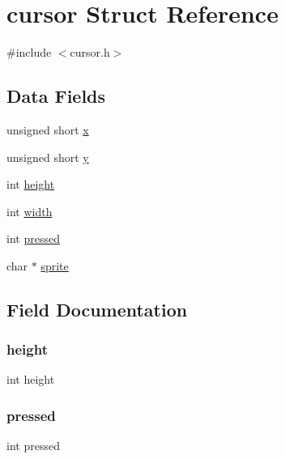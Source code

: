 \hypertarget{structcursor}{}\section{cursor Struct Reference}
\label{structcursor}


{\ttfamily \#include $<$cursor.\+h$>$}

\subsection*{Data Fields}
\begin{DoxyCompactItemize}
\item 
unsigned short \hyperlink{structcursor_a6762fe907d546b988585b308b1c304c2}{x}
\item 
unsigned short \hyperlink{structcursor_a8c9c5ccb800d748c485dfe2b6fa2cd9e}{y}
\item 
int \hyperlink{structcursor_ad12fc34ce789bce6c8a05d8a17138534}{height}
\item 
int \hyperlink{structcursor_a2474a5474cbff19523a51eb1de01cda4}{width}
\item 
int \hyperlink{structcursor_a9a8271834e4fd4341e41a0e182d6cdff}{pressed}
\item 
char $\ast$ \hyperlink{structcursor_a6cffc5f58f86106ef1a6ea2f745efda1}{sprite}
\end{DoxyCompactItemize}


\subsection{Field Documentation}
\hypertarget{structcursor_ad12fc34ce789bce6c8a05d8a17138534}{}\label{structcursor_ad12fc34ce789bce6c8a05d8a17138534} 
\subsubsection{\texorpdfstring{height}{height}}
{\footnotesize\ttfamily int height}

\hypertarget{structcursor_a9a8271834e4fd4341e41a0e182d6cdff}{}\label{structcursor_a9a8271834e4fd4341e41a0e182d6cdff} 
\subsubsection{\texorpdfstring{pressed}{pressed}}
{\footnotesize\ttfamily int pressed}

